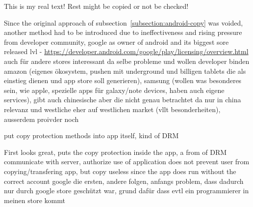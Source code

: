 This is my real text! Rest might be copied or not be checked!

Since the original approach of subsection~\ref{subsection:android-copy} was voided, another method had to be introduced due to ineffectiveness and rising pressure from developer community, google as owner of android and its biggest sore released lvl - \url{https://developer.android.com/google/play/licensing/overview.html}
auch für andere stores interessant da selbe probleme und wollen developer binden
amazon (eigenes ökosystem, pushen mit underground und billigen tablets die als einstieg dienen und app store soll generieren), samsung (wollen was besonderes sein, wie apple, spezielle apps für galaxy/note devices, haben auch eigene services), gibt auch chinesische aber die nicht genau betrachtet da nur in china relevanz und westliche eher auf westlichen market (vllt besonderheiten), ausserdem proivder noch
\cite{munteanLicense}


put copy protection methods into app itself, kind of DRM


First looks great, puts the copy protection inside the app, a from of DRM\newline
communicate with server, authorize use of application\newline
does not prevent user from copying/transfering app, but copy useless since the app does run without the correct account\newline
google die ersten, andere folgen, anfangs problem, dass dadurch nur durch google store geschützt war, grund dafür dass evtl ein programmierer in meinen store kommt\newline
